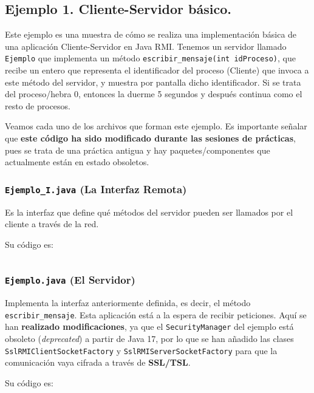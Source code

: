 \documentclass[a4paper,12pt]{article}
\begin{document}
		\subsection{Ejemplo 1. Cliente-Servidor básico.}
			Este ejemplo es una muestra de cómo se realiza una implementación básica de una aplicación Cliente-Servidor en Java RMI. Tenemos un servidor llamado \texttt{Ejemplo} que implementa un método \texttt{escribir\_mensaje(int idProceso)}, que recibe un entero que representa el identificador del proceso (Cliente) que invoca a este método del servidor, y muestra por pantalla dicho identificador. Si se trata del proceso/hebra 0, entonces la duerme 5 segundos y después continua como el resto de procesos.
			
			Veamos cada uno de los archivos que forman este ejemplo. Es importante señalar que \textbf{este código ha sido modificado durante las sesiones de prácticas}, pues se trata de una práctica antigua y hay paquetes/componentes que actualmente están en estado obsoletos.
			
			\subsubsection{\texttt{Ejemplo\_I.java} (La Interfaz Remota)}
				Es la interfaz que define qué métodos del servidor pueden ser llamados por el cliente a través de la red.
				
				Su código es:			
				\inputminted[linenos, frame=lines, fontsize=\footnotesize]{Java}{../codigo/Parte_1_Implementacion_de_Ejemplos/Ejemplo_1/Ejemplo_I.java}
			
			\subsubsection{\texttt{Ejemplo.java} (El Servidor)}
				Implementa la interfaz anteriormente definida, es decir, el método \texttt{escribir\_mensaje}. Esta aplicación está a la espera de recibir peticiones. Aquí se han \textbf{realizado modificaciones}, ya que el \texttt{SecurityManager} del ejemplo está obsoleto (\textit{deprecated}) a partir de Java 17, por lo que se han añadido las clases \texttt{SslRMIClientSocketFactory} y \texttt{SslRMIServerSocketFactory} para que la comunicación vaya cifrada a través de \textbf{SSL/TSL}.
				
				Su código es:			
				\inputminted[linenos, frame=lines, fontsize=\footnotesize]{Java}{../codigo/Parte_1_Implementacion_de_Ejemplos/Ejemplo_1/Ejemplo.java}
			
\end{document}
